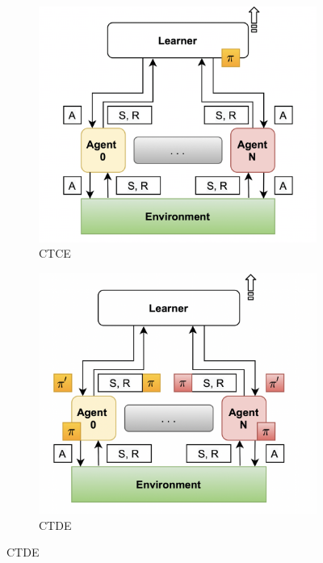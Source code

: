 \documentclass[12pt,a4paper,openright,twoside]{book}
\begin{document}
\begin{figure}[t]
    \begin{subfigure}[b]{0.32\textwidth}
        \centering
        \includegraphics[width=\textwidth]{figures/CTCE.png}
        \caption{CTCE}
        \label{fig:ctce}
    \end{subfigure}
    \begin{subfigure}[b]{0.32\textwidth}
        \centering
        \includegraphics[width=\textwidth]{figures/CTDE.png}
        \caption{CTDE}

\end{subfigure}
\end{figure}
\end{document}
